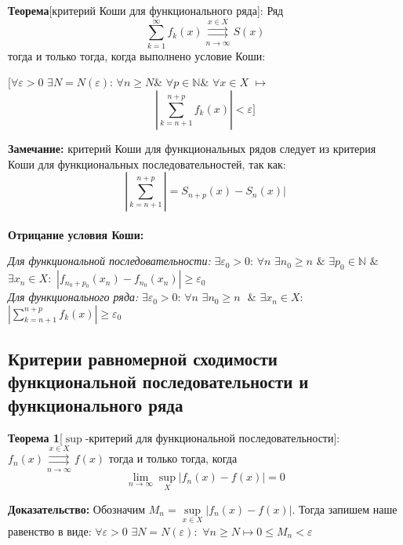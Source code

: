 \documentclass[a4paper,12pt]{article} %
\begin{document}
\noindent \textbf{Теорема}[критерий Коши для функционального ряда]: \newline
Ряд $$\sum_{k = 1}^{\infty}  f_k(x) \overset{x \in X}{\underset{n \rightarrow \infty}{\rightrightarrows}} S(x)$$ тогда и только тогда, когда выполнено условие Коши: 
\newline 

\hspace*{5mm}$\big[\forall \varepsilon > 0 $  $\exists N = N(\varepsilon)$: $\forall n \geq N \& $   $\forall p \in  \mathds{N} \&$ $\forall x \in X$ $\longmapsto$ \newline 
\hspace*{50mm}$$|\sum_{k = n+1}^{n+p}f_k(x)| < \varepsilon\big]$$

\noindent \textbf{Замечание:} критерий Коши для функциональных рядов следует из критерия Коши для функциональных последовательностей, так как: \newline 
$$|\sum_{k = n+1}^{n+p}| = S_{n+p}(x) - S_n(x)|$$
\\[5 mm]
\noindent \textbf{Отрицание условия Коши:} 
\newline 

\textit{Для функциональной последовательности:}
\newline
$\exists \varepsilon_0 > 0$: $\forall n$ $\exists n_0 \geq n$ $\& $ $\exists  p_0 \in \mathds{N}$ $\&$ $\exists x_n \in X:$ $|f_{n_0+p_0}(x_n) - f_{n_0}(x_n)| \geq \varepsilon_0$ 
\\[5mm] 
\textit{Для функционального ряда:}
\newline
$\exists \varepsilon_0 > 0$: $\forall n$ $\exists n_0 \geq n \text{ }\& $ $\exists x_n \in X:$ $|\sum\limits_{k = n+1}^{n+p}f_k(x)| \geq \varepsilon_0$ 

\subsection{Критерии равномерной сходимости функциональной последовательности и функционального ряда }

\noindent \textbf{Теорема 1}[$\sup$-критерий для функциональной последовательности]:\newline 
$f_n(x) \overset{x \in X}{\underset{n \rightarrow \infty}{\rightrightarrows}} f(x)$ тогда и только тогда, когда $$\lim\limits_{n \rightarrow \infty} \sup_{X}|f_n(x)-f(x)| = 0$$

\noindent \textbf{Доказательство:} 
\newline
Обозначим $M_n = \sup\limits_{x \in X}{|f_n(x)-f(x)|}$. \newline
Тогда запишем  наше равенство в виде: \newline
\hspace*{40mm}$\forall \varepsilon > 0$ $\exists N = N(\varepsilon):$ $\forall n \geq N \mapsto 0 \leq M_n < \varepsilon$ \newline
\end{document}
